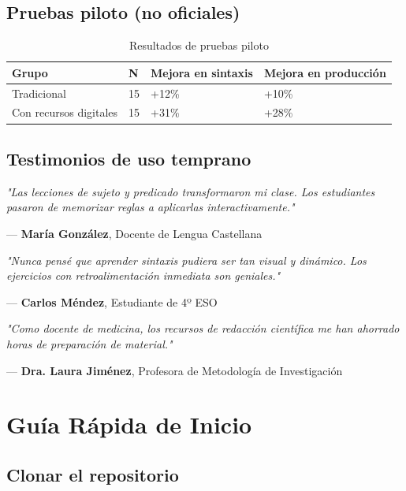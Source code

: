 \documentclass[12pt,spanish]{article}
\begin{document}
\subsection{Pruebas piloto (no oficiales)}

\begin{table}[H]
\centering
\caption{Resultados de pruebas piloto}
\label{tab:resultados_piloto}
\begin{tabular}{|p{3cm}|p{4cm}|p{4cm}|p{4cm}|}
\hline
\textbf{Grupo} & \textbf{N} & \textbf{Mejora en sintaxis} & \textbf{Mejora en producción} \\
\hline
Tradicional & 15 & +12\% & +10\% \\
\hline
Con recursos digitales & 15 & +31\% & +28\% \\
\hline
\end{tabular}
\end{table}

\subsection{Testimonios de uso temprano}

\begin{nota}
\textit{"Las lecciones de sujeto y predicado transformaron mi clase. Los estudiantes pasaron de memorizar reglas a aplicarlas interactivamente."}

— \textbf{María González}, Docente de Lengua Castellana
\end{nota}

\begin{nota}
\textit{"Nunca pensé que aprender sintaxis pudiera ser tan visual y dinámico. Los ejercicios con retroalimentación inmediata son geniales."}

— \textbf{Carlos Méndez}, Estudiante de 4º ESO
\end{nota}

\begin{nota}
\textit{"Como docente de medicina, los recursos de redacción científica me han ahorrado horas de preparación de material."}

— \textbf{Dra. Laura Jiménez}, Profesora de Metodología de Investigación
\end{nota}

\section{Guía Rápida de Inicio}

\subsection{Clonar el repositorio}
\end{document}
